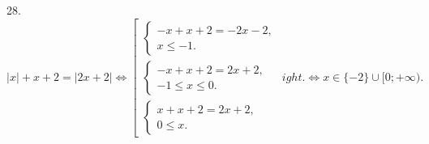 28. $|x|+x+2=|2x+2|\Leftrightarrow \left[\begin{array}{l}\begin{cases} -x+x+2=-2x-2,\\ x\leqslant -1.\end{cases}\\
\begin{cases} -x+x+2=2x+2,\\ -1\leqslant x\leqslant 0 .\end{cases}\\\begin{cases} x+x+2=2x+2,\\ 0\leqslant x.\end{cases}\end{array}
ight.\Leftrightarrow
x\in \{-2\}\cup[0;+\infty).$\\

